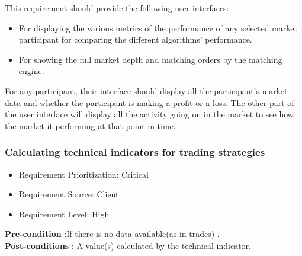 \documentclass[12pt]{article}
\begin{document}
								This requirement should provide the following user interfaces:
									\begin{itemize}
										\item  For displaying the various metrics of the performance of any selected market participant for comparing the different algorithms' performance.
										\item For showing the full market depth and matching orders by the matching engine.
									\end{itemize}
									
									For any participant, their interface should display all the participant's market data and whether the participant is making a profit or a loss. 
									The other part of the user interface will display all the activity going on in the market to see how the market it performing at that point in time.								
					
				\subsubsection{Calculating technical indicators for trading strategies}
						\begin{itemize}
							\item Requirement Prioritization: Critical
							\item Requirement Source: Client
							\item Requirement Level: High 	
						\end{itemize}
						
				\textbf{Pre-condition} :If there is no data available(as in trades) .\\
				\textbf{Post-conditions} : A value(s) calculated by the technical indicator.\\ 
						
\end{document}
